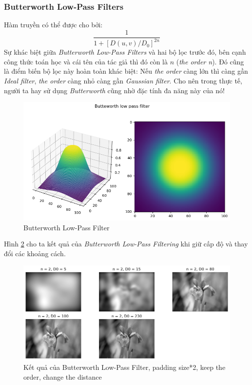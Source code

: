 \documentclass{article}
\begin{document}
        \subsubsection{Butterworth Low-Pass Filters}
        Hàm truyền có thể được cho bởi:
        $$ \frac{1}{1+\left[D(u,v)/D_{0} \right]^{2n}}$$
        Sự khác biệt giữa \textit{Butterworth Low-Pass Filters} và hai bộ lọc trước đó, bên cạnh công thức toán học và cái tên của tác giả thì đó còn là $n$ (\textit{the order n}). Đó cũng là điểm biến bộ lọc này hoàn toàn khác biệt: Nếu \textit{the order} càng lớn thì càng gần \textit{Ideal filter}, \textit{the order} càng nhỏ càng gần \textit{Gaussian filter}. Cho nên trong thực tế, người ta hay sử dụng \textit{Butterworth} cũng nhờ đặc tính đa năng này của nó!\\
        \begin{figure}[ht!]
        \centering
        \includegraphics[width = \linewidth]{fo15.png}
        \caption{Butterworth Low-Pass Filter}
        \label{fig16}
        \end{figure}
        Hình \ref{fig17} cho ta kết quả của \textit{Butterworth Low-Pass Filtering} khi giữ cấp độ và thay đổi các khoảng cách.
        \begin{figure}[ht!]
        \centering
        \includegraphics[width = \linewidth]{fo16.png}
        \caption{Kết quả của Butterworth Low-Pass Filter, padding size*2, keep the order, change the distance}
        \label{fig17}
        \end{figure}
\end{document}
